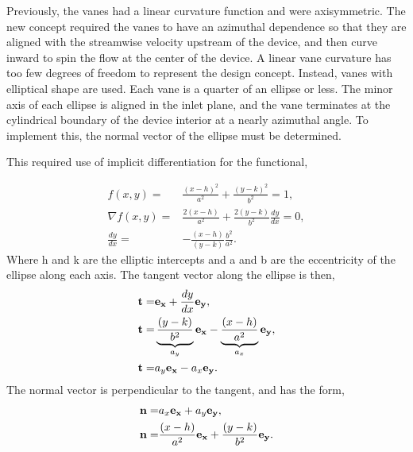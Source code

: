 Previously, the vanes had a linear curvature function and were
axisymmetric. The new concept required the vanes to have an azimuthal
dependence so that they are aligned with the streamwise velocity upstream 
of the device, and then curve inward to spin the flow at the center of
the device. A linear vane curvature has
too few degrees of freedom to represent the design concept. 
Instead, vanes with elliptical shape are used. Each vane is a quarter of 
an ellipse or less. The minor axis of each ellipse is aligned in the inlet 
plane, and the vane terminates at the cylindrical boundary of the device interior 
at a nearly azimuthal angle. To implement this, the normal vector of the ellipse 
must be determined. 

This required use of implicit differentiation for the functional,

\begin{eqnarray}
 f(x,y)  =& \frac{(x-h)^2}{a^2} + \frac{(y-k)^2}{b^2} = 1, \\
 \nabla f(x,y) =& \frac{2 (x-h)}{a^2} + \frac{2 (y-k)}{b^2}\frac{dy}{dx} = 0, \\
 \frac{dy}{dx} =& -\frac{(x-h)}{(y-k)}\frac{b^2}{a^2}. 
\end{eqnarray}
Where h and k are the elliptic intercepts and a and b are the
eccentricity of the ellipse along each axis. The tangent vector along
the ellipse is then,  
\begin{eqnarray}
 {\bf t} =& {\bf e_x} + \frac{dy}{dx}{\bf e_y}, \\
 {\bf t} =& \underbrace{\frac{(y-k)}{b^2}}_{a_y} {\bf e_x} -
  \underbrace{\frac{(x-h)}{a^2}}_{a_x}{\bf e_y}, \\
 {\bf t} =& {a_y} {\bf e_x} - {a_x}{\bf e_y}. 
\end{eqnarray}
%
The normal vector is perpendicular to the tangent, and has the form, 
\begin{eqnarray}
 {\bf n} =& {a_x} {\bf e_x} + {a_y}{\bf e_y}, \label{eqn:a_x}\\
 {\bf n} =& \frac{(x-h)}{a^2} {\bf e_x} + \frac{(y-k)}{b^2} {\bf e_y}.
\end{eqnarray}

